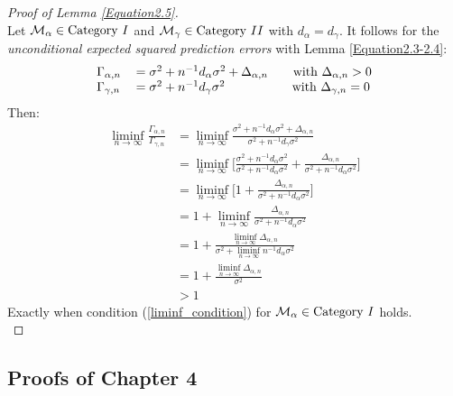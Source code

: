 \documentclass[Research_Module_ES.tex]{subfiles}
\begin{document}
\begin{proof}[Proof of Lemma \ref{Equation2.5}]~\\
	Let $\mathcal{M}_\alpha\in\text{Category}~\RM{1}$ and $\mathcal{M}_\gamma\in\text{Category}~\RM{2}$ with $d_\alpha=d_\gamma$. It follows for the \textit{unconditional expected squared prediction errors} with Lemma \ref{Equation2.3-2.4}:
	\begin{align*}
	\begin{tabular}{ll}
	$\Gamma_{\alpha,n}$&$=\sigma^2+n^{-1}d_\alpha\sigma^2+\Delta_{\alpha,n}~~~~~$ with $\Delta_{\alpha,n}>0$\\
	$\Gamma_{\gamma,n}$&$=\sigma^2+n^{-1}d_\gamma\sigma^2~~~~~~~~~~~~~~~~$with $\Delta_{\gamma,n}=0$
	\end{tabular}
	\end{align*}
	Then:
	\begin{align*}
	\liminf_{n\rightarrow\infty}\frac{\Gamma_{\alpha,n}}{\Gamma_{\gamma,n}}&=\liminf_{n\rightarrow\infty}\frac{\sigma^2+n^{-1}d_\alpha\sigma^2+\Delta_{\alpha,n}}{\sigma^2+n^{-1}d_\gamma\sigma^2}	\\
	&=\liminf_{n\rightarrow\infty}\Big[\frac{\sigma^2+n^{-1}d_\alpha\sigma^2}{\sigma^2+n^{-1}d_\alpha\sigma^2}+\frac{\Delta_{\alpha,n}}{\sigma^2+n^{-1}d_\alpha\sigma^2}\Big]\\
	&=\liminf_{n\rightarrow\infty}\Big[1+\frac{\Delta_{\alpha,n}}{\sigma^2+n^{-1}d_\alpha\sigma^2}\Big]\\
	&=1+\liminf_{n\rightarrow\infty}\frac{\Delta_{\alpha,n}}{\sigma^2+n^{-1}d_\alpha\sigma^2}\\
	&=1+\frac{\liminf_{n\rightarrow\infty}\Delta_{\alpha,n}}{\sigma^2+ \liminf_{n\rightarrow\infty} n^{-1}d_\alpha\sigma^2}\\
	&=1+\frac{\liminf_{n\rightarrow\infty}\Delta_{\alpha,n}}{\sigma^2}\\
	&>1
	\end{align*}
	Exactly when condition (\ref{liminf_condition}) for $\mathcal{M}_\alpha\in\text{Category}~\RM{1}$ holds.\\
\end{proof}


\subsection{Proofs of Chapter 4}
\end{document}

